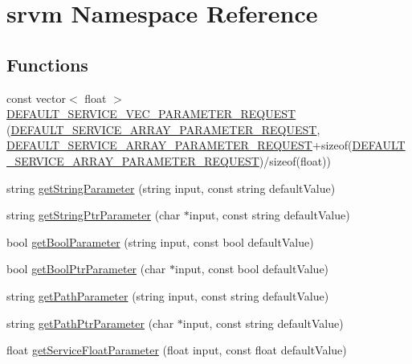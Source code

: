 \hypertarget{namespacesrvm}{\section{srvm Namespace Reference}
\label{namespacesrvm}
}
\subsection*{Functions}
\begin{DoxyCompactItemize}
\item 
const vector$<$ float $>$ \hyperlink{namespacesrvm_a78080cf77ae5d29a39ebcd3309b836fc}{D\-E\-F\-A\-U\-L\-T\-\_\-\-S\-E\-R\-V\-I\-C\-E\-\_\-\-V\-E\-C\-\_\-\-P\-A\-R\-A\-M\-E\-T\-E\-R\-\_\-\-R\-E\-Q\-U\-E\-S\-T} (\hyperlink{namespacesrvm_a07324815e3638c6740336e50699d3300}{D\-E\-F\-A\-U\-L\-T\-\_\-\-S\-E\-R\-V\-I\-C\-E\-\_\-\-A\-R\-R\-A\-Y\-\_\-\-P\-A\-R\-A\-M\-E\-T\-E\-R\-\_\-\-R\-E\-Q\-U\-E\-S\-T}, \hyperlink{namespacesrvm_a07324815e3638c6740336e50699d3300}{D\-E\-F\-A\-U\-L\-T\-\_\-\-S\-E\-R\-V\-I\-C\-E\-\_\-\-A\-R\-R\-A\-Y\-\_\-\-P\-A\-R\-A\-M\-E\-T\-E\-R\-\_\-\-R\-E\-Q\-U\-E\-S\-T}+sizeof(\hyperlink{namespacesrvm_a07324815e3638c6740336e50699d3300}{D\-E\-F\-A\-U\-L\-T\-\_\-\-S\-E\-R\-V\-I\-C\-E\-\_\-\-A\-R\-R\-A\-Y\-\_\-\-P\-A\-R\-A\-M\-E\-T\-E\-R\-\_\-\-R\-E\-Q\-U\-E\-S\-T})/sizeof(float))
\item 
string \hyperlink{namespacesrvm_a9c76ccfdb20b5ade1a837f4888a64997}{get\-String\-Parameter} (string input, const string default\-Value)
\item 
string \hyperlink{namespacesrvm_a2fe9c141c7827eaa0269319f179dfee5}{get\-String\-Ptr\-Parameter} (char $\ast$input, const string default\-Value)
\item 
bool \hyperlink{namespacesrvm_ac652beec1eacae6f527677f11e2a9256}{get\-Bool\-Parameter} (string input, const bool default\-Value)
\item 
bool \hyperlink{namespacesrvm_a4a300ace21cdfc4e753d7bbf97620f69}{get\-Bool\-Ptr\-Parameter} (char $\ast$input, const bool default\-Value)
\item 
string \hyperlink{namespacesrvm_a2d37598ea68edd23c273e90b7f544e85}{get\-Path\-Parameter} (string input, const string default\-Value)
\item 
string \hyperlink{namespacesrvm_acad80730421eaf35cda6c8dcb0c3b4d6}{get\-Path\-Ptr\-Parameter} (char $\ast$input, const string default\-Value)
\item 
float \hyperlink{namespacesrvm_ab17b035d854cf06a49bf869d1c23d76d}{get\-Service\-Float\-Parameter} (float input, const float default\-Value)

\end{DoxyCompactItemize}

